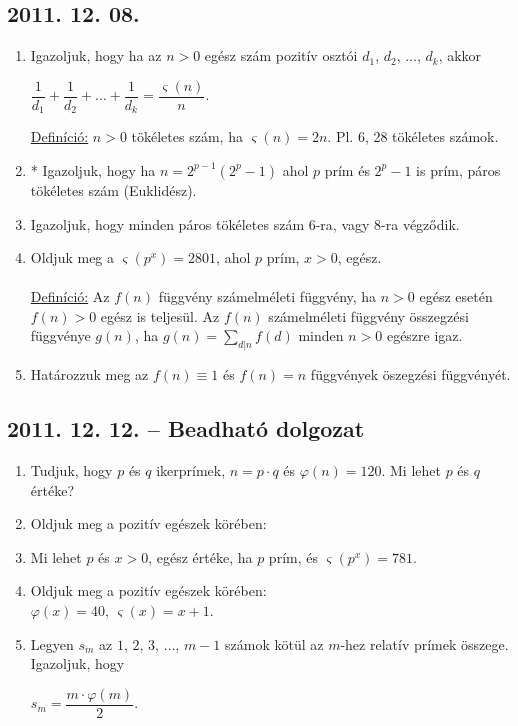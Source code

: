 	
	\subsection*{2011. 12. 08.}
	\begin{enumerate}
		\item Igazoljuk, hogy ha az $n>0$ egész szám pozitív osztói $d_1$, $d_2$, $\ldots$, $d_k$, akkor 
		\begin{center}
			$\dfrac{1}{d_1}+\dfrac{1}{d_2}+\ldots+\dfrac{1}{d_k}=\dfrac{\varsigma(n)}{n}$.
		\end{center}
		\underline{Definíció:} $n>0$ tökéletes szám, ha $\varsigma(n)=2n$. Pl. 6, 28 tökéletes számok.
		\item * Igazoljuk, hogy ha $n=2^{p-1}(2^p-1)$ ahol $p$ prím és $2^p-1$ is prím, páros tökéletes szám (Euklidész).
		\item Igazoljuk, hogy minden páros tökéletes szám 6-ra, vagy 8-ra végződik.
		\item Oldjuk meg a $\varsigma(p^x)=2801$, ahol $p$ prím, $x>0$, egész.\\\\
		\underline{Definíció:} Az $f(n)$ függvény számelméleti függvény, ha $n>0$ egész esetén $f(n)>0$ egész is teljesül. Az $f(n)$ számelméleti függvény összegzési függvénye $g(n)$, ha $g(n)=\sum\limits_{d|n}f(d)$ minden $n>0$ egészre igaz.
		\item Határozzuk meg az $f(n)\equiv1$ és $f(n)=n$ függvények öszegzési függvényét.
	\end{enumerate}
	
	
	\subsection*{2011. 12. 12. -- Beadható dolgozat}
	\begin{enumerate}
		\item Tudjuk, hogy $p$ és $q$ ikerprímek, $n=p\cdot q$ és $\varphi(n)=120$. Mi lehet $p$ és $q$ értéke?
		\item Oldjuk meg a pozitív egészek körében:
		\item Mi lehet $p$ és $x>0$, egész értéke, ha $p$ prím, és $\varsigma(p^x)=781$.
		\item Oldjuk meg a pozitív egészek körében:\\
		$\varphi(x)=40$, $\varsigma(x)=x+1$.
		\item Legyen $s_m$ az $1$, $2$, $3$, $\ldots$, $m-1$ számok kötül az $m$-hez relatív prímek összege. Igazoljuk, hogy
		\begin{center}
			$s_m=\dfrac{m\cdot\varphi(m)}{2}$.
		\end{center}
	\end{enumerate}
	
